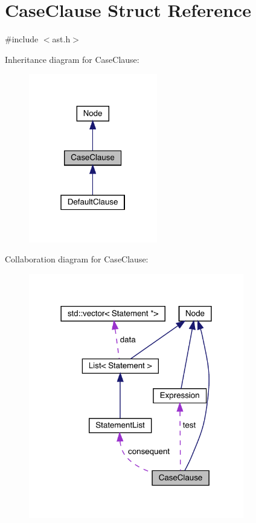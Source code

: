 \hypertarget{struct_case_clause}{}\section{Case\+Clause Struct Reference}
\label{struct_case_clause}


{\ttfamily \#include $<$ast.\+h$>$}



Inheritance diagram for Case\+Clause\+:
\nopagebreak
\begin{figure}[H]
\begin{center}
\leavevmode
\includegraphics[width=159pt]{struct_case_clause__inherit__graph}
\end{center}
\end{figure}


Collaboration diagram for Case\+Clause\+:
\nopagebreak
\begin{figure}[H]
\begin{center}
\leavevmode
\includegraphics[width=266pt]{struct_case_clause__coll__graph}
\end{center}
\end{figure}
